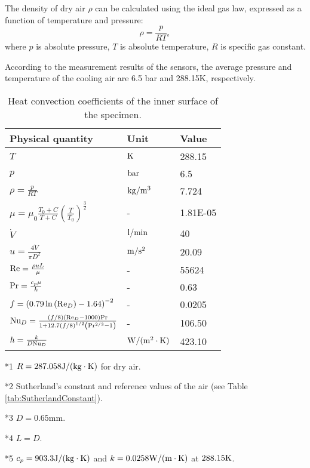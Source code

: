 The density of dry air $\rho$ can be calculated using the ideal gas law, expressed as a function of temperature and pressure:
\begin{equation}
\rho  = \frac{p}{{RT}},
\label{Equ:AirDensity}
\end{equation}
where
$p$ is absolute pressure,
$T$ is absolute temperature,
$R$ is specific gas constant.

According to the measurement results of the sensors, the average pressure and temperature of the cooling air are 6.5 bar and 288.15K, respectively.

\renewcommand\arraystretch{1.4}
\begin{table}[htbp]
\centering
  \begin{threeparttable}
  \centering
  \caption{Heat convection coefficients of the inner surface of the specimen.}
    \begin{tabular}{p{6cm}p{3cm}p{3cm}}
    \toprule
    Physical quantity   & Unit & Value  \\
    \midrule
    $T$   & ${\rm{K}}$ & 288.15  \\
    $p$   & ${\rm{bar}}$ & 6.5   \\
    $\rho  = \frac{p}{{RT}}$ \tnote{*1} & ${\rm{kg/}}{{\rm{m}}^{\rm{3}}}$ & 7.724 \\
    $\mu  = {\mu _0}\frac{{{T_0} + C}}{{T + C}}{\left( {\frac{T}{{{T_0}}}} \right)^{\frac{3}{2}}}$ \tnote{*2} & -     & 1.81E-05 \\
    ${\dot V}$ & ${\rm{l/min}}$ & 40  \\
    $u = \frac{{4\dot V}}{{\pi {D^2}}}$ \tnote{*3} & ${\rm{m/}}{{\rm{s}}^2}$ & 20.09  \\
    ${\rm{Re}} = \frac{{\rho uL}}{\mu }$ \tnote{*4} & -     & 55624  \\
    ${\rm{Pr}} = \frac{{{c_p}\mu }}{k}$ \tnote{*5} & -     & 0.63  \\
    $f = {\left( {0.79\ln \left( {{\rm{R}}{{\rm{e}}_D}} \right) - 1.64} \right)^{ - 2}}$ & -     & 0.0205  \\
    ${\rm{N}}{{\rm{u}}_D} = \frac{{\left( {f/8} \right)\left( {{\rm{R}}{{\rm{e}}_D} - 1000} \right){\rm{Pr}}}}{{1 + 12.7{{(f/8)}^{1/2}}\left( {{\rm{P}}{{\rm{r}}^{2/3}} - 1} \right)}}$ & -     & 106.50  \\
    $h = \frac{k}{{D{\rm{N}}{{\rm{u}}_D}}}$ & ${\rm{W/(}}{{\rm{m}}^{\rm{2}}} \cdot {\rm{K)}}$ & 423.10  \\
    \bottomrule
    \end{tabular}%
    \begin{tablenotes}
    \item[*1] $R = 287.058 {\rm{J/(kg}} \cdot {\rm{K}})$ for dry air.
    \item[*2] Sutherland's constant and reference values of the air (see Table \ref{tab:SutherlandConstant}).
    \item[*3] $D=0.65$mm.
    \item[*4] $L=D$.
    \item[*5] $c_{p}=903.3 {\rm{J/(kg}} \cdot {\rm{K}})$ and $k=0.0258 {\rm{W/(m}} \cdot {\rm{K}})$ at $288.15{\rm{K}}$.
    \end{tablenotes}
    \end{threeparttable}
  \label{tab:addlabel}%
\end{table}%
